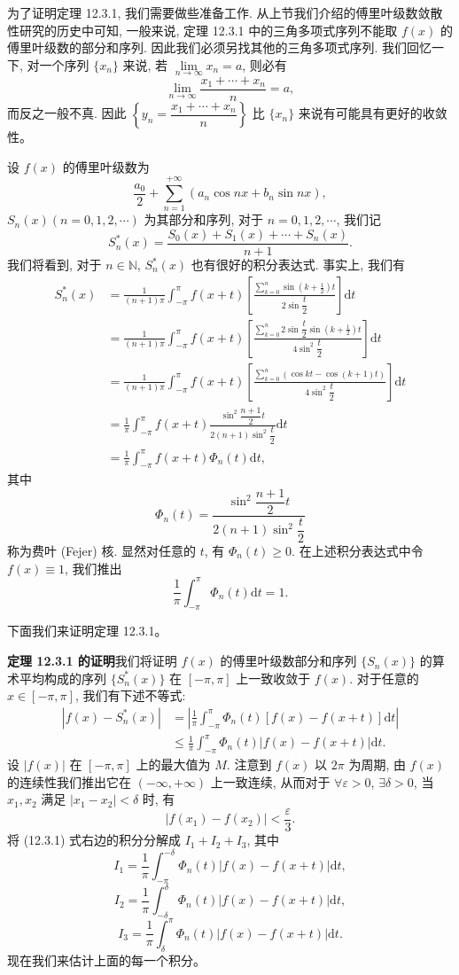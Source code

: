 \documentclass[UTF8, 12pt, fontset=fandol, oneside]{ctexart}
\begin{document}
为了证明定理 12.3.1, 我们需要做些准备工作. 从上节我们介绍的傅里叶级数敛散性研究的历史中可知, 一般来说, 定理 12.3.1 中的三角多项式序列不能取 $f(x)$ 的傅里叶级数的部分和序列. 因此我们必须另找其他的三角多项式序列. 我们回忆一下, 对一个序列 $\{x_n\}$ 来说, 若 $\lim\limits_{n\to\infty}x_n=a$, 则必有
\[
  \lim_{n\to\infty}\frac{x_1+\cdots+x_n}{n}=a,
\]
而反之一般不真. 因此 $\left\{y_n=\dfrac{x_1+\cdots+x_n}{n}\right\}$ 比 $\{x_n\}$ 来说有可能具有更好的收敛性。

设 $f(x)$ 的傅里叶级数为
\[
  \frac{a_0}{2}+\sum_{n=1}^{+\infty}(a_n\cos nx+b_n\sin nx),
\]
$S_n(x)(n=0,1,2,\cdots)$ 为其部分和序列, 对于 $n=0,1,2,\cdots$, 我们记
\[
  S_n^*(x)=\frac{S_0(x)+S_1(x)+\cdots+S_n(x)}{n+1}.
\]
我们将看到, 对于 $n\in\mathbb N$, $S_n^*(x)$ 也有很好的积分表达式. 事实上, 我们有
\[
\begin{aligned}
  S_n^*(x)
  &=\frac{1}{(n+1)\pi}\int_{-\pi}^{\pi}f(x+t)
    \left[
      \frac{\displaystyle\sum_{k=0}^n\sin\left(k+\frac12\right)t}{2\sin\dfrac t2}
    \right]\mathrm dt\\
  &=\frac{1}{(n+1)\pi}\int_{-\pi}^{\pi}f(x+t)
    \left[
      \frac{\displaystyle\sum_{k=0}^n2\sin\dfrac t2\sin\left(k+\frac12\right)t}{4\sin^2\dfrac t2}
    \right]\mathrm dt\\
  &=\frac{1}{(n+1)\pi}\int_{-\pi}^{\pi}f(x+t)
    \left[
      \frac{\displaystyle\sum_{k=0}^n(\cos kt-\cos(k+1)t)}{4\sin^2\dfrac t2}
    \right]\mathrm dt\\
  &=\frac1\pi\int_{-\pi}^{\pi}f(x+t)
    \frac{\sin^2\dfrac{n+1}{2}t}{2(n+1)\sin^2\dfrac t2}\mathrm dt\\
  &=\frac1\pi\int_{-\pi}^{\pi}f(x+t)\Phi_n(t)\mathrm dt,
\end{aligned}
\]
其中
\[
  \Phi_n(t)=\frac{\sin^2\dfrac{n+1}{2}t}{2(n+1)\sin^2\dfrac t2}
\]
称为费叶 (Fejer) 核. 显然对任意的 $t$, 有 $\Phi_n(t)\geqslant0$. 在上述积分表达式中令 $f(x)\equiv1$, 我们推出
\[
  \frac1\pi\int_{-\pi}^{\pi}\Phi_n(t)\mathrm dt=1.
\]

下面我们来证明定理 12.3.1。

\noindent\textbf{定理 12.3.1 的证明}\quad 我们将证明 $f(x)$ 的傅里叶级数部分和序列 $\{S_n(x)\}$ 的算术平均构成的序列 $\{S_n^*(x)\}$ 在 $[-\pi,\pi]$ 上一致收敛于 $f(x)$. 对于任意的 $x\in[-\pi,\pi]$, 我们有下述不等式:
\begin{equation}
\begin{aligned}
  |f(x)-S_n^*(x)|
  &=\left|\frac1\pi\int_{-\pi}^{\pi}\Phi_n(t)[f(x)-f(x+t)]\mathrm dt\right|\\
  &\leqslant\frac1\pi\int_{-\pi}^{\pi}\Phi_n(t)|f(x)-f(x+t)|\mathrm dt.
\end{aligned}
\tag{12.3.1}
\end{equation}
设 $|f(x)|$ 在 $[-\pi,\pi]$ 上的最大值为 $M$. 注意到 $f(x)$ 以 $2\pi$ 为周期, 由 $f(x)$ 的连续性我们推出它在 $(-\infty,+\infty)$ 上一致连续, 从而对于 $\forall\varepsilon>0$, $\exists\delta>0$, 当 $x_1,x_2$ 满足 $|x_1-x_2|<\delta$ 时, 有
\[
  |f(x_1)-f(x_2)|<\frac{\varepsilon}{3}.
\]
将 (12.3.1) 式右边的积分分解成 $I_1+I_2+I_3$, 其中
\[
  I_1=\frac1\pi\int_{-\pi}^{-\delta}\Phi_n(t)|f(x)-f(x+t)|\mathrm dt,
\]
\[
  I_2=\frac1\pi\int_{-\delta}^{\delta}\Phi_n(t)|f(x)-f(x+t)|\mathrm dt,
\]
\[
  I_3=\frac1\pi\int_{\delta}^{\pi}\Phi_n(t)|f(x)-f(x+t)|\mathrm dt.
\]
现在我们来估计上面的每一个积分。
\end{document}
